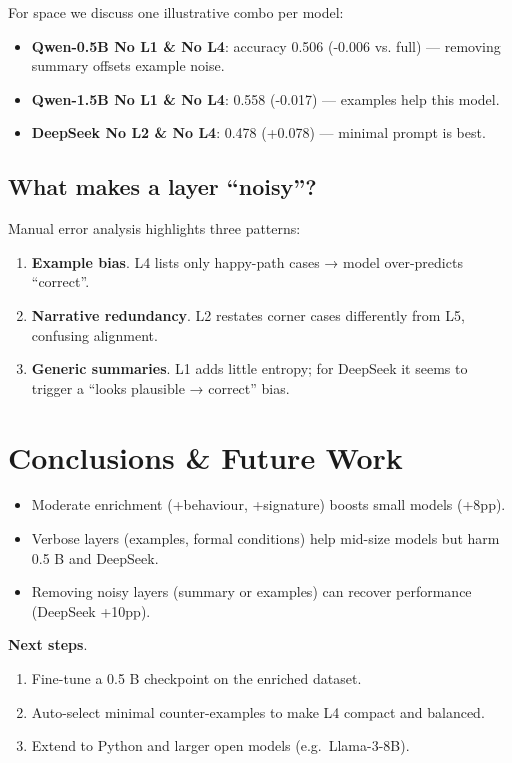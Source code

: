 \documentclass[a4paper]{usiinfbachelorproject}
\begin{document}
For space we discuss one illustrative combo per model:

\begin{itemize}[leftmargin=12pt]
  \item \textbf{Qwen-0.5B No L1 \& No L4}: accuracy 0.506 (-0.006 vs. full) — removing summary offsets example noise.  
  \item \textbf{Qwen-1.5B No L1 \& No L4}: 0.558 (-0.017) — examples help this model.  
  \item \textbf{DeepSeek No L2 \& No L4}: 0.478 (+0.078) — minimal prompt is best.  
\end{itemize}

\subsection{What makes a layer “noisy”?}
Manual error analysis highlights three patterns:

\begin{enumerate}[label=\alph*),leftmargin=15pt,itemsep=0pt]
  \item \textbf{Example bias}.  L4 lists only happy-path cases → model over-predicts “correct”.  
  \item \textbf{Narrative redundancy}.  L2 restates corner cases differently from L5, confusing alignment.  
  \item \textbf{Generic summaries}.  L1 adds little entropy; for DeepSeek it seems to trigger a “looks plausible → correct” bias.
\end{enumerate}

\section{Conclusions \& Future Work}\label{sec:concl}

\begin{itemize}[leftmargin=12pt]
  \item Moderate enrichment (+behaviour, +signature) boosts small models (+8pp).  
  \item Verbose layers (examples, formal conditions) help mid-size models but harm 0.5 B and DeepSeek.  
  \item Removing noisy layers (summary or examples) can recover performance (DeepSeek +10pp).  
\end{itemize}

\textbf{Next steps}.  
\begin{enumerate}[label=\arabic*.]
  \item Fine-tune a 0.5 B checkpoint on the enriched dataset.  
  \item Auto-select minimal counter-examples to make L4 compact and balanced.  
  \item Extend to Python and larger open models (e.g.\ Llama-3-8B).  
\end{enumerate}



\end{document}
